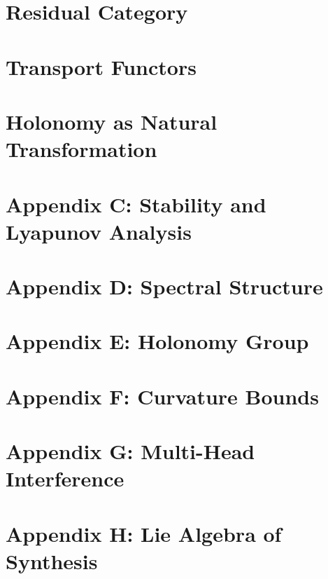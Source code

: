 \documentclass[11pt]{article}
\begin{document}
\section{Residual Category}

\section{Transport Functors}

\section{Holonomy as Natural Transformation}

\appendix





\section*{Appendix C: Stability and Lyapunov Analysis}

\section*{Appendix D: Spectral Structure}

\section*{Appendix E: Holonomy Group}

\section*{Appendix F: Curvature Bounds}

\section*{Appendix G: Multi-Head Interference}

\section*{Appendix H: Lie Algebra of Synthesis}
\end{document}
